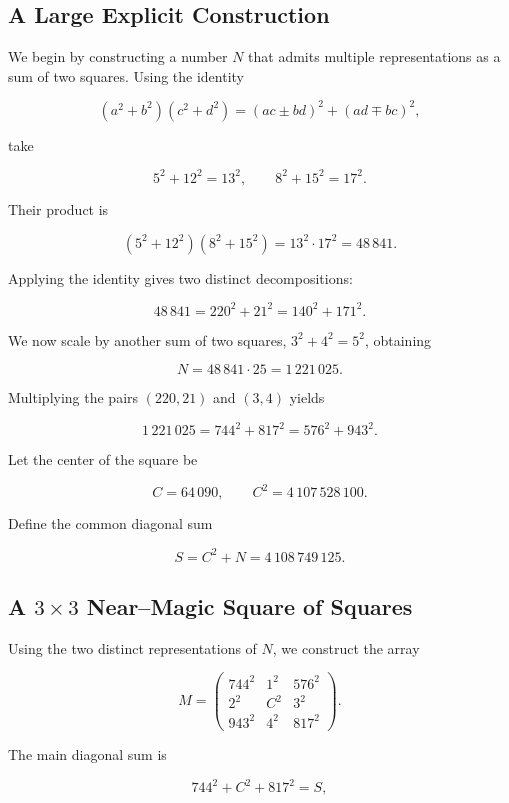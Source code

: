 \documentclass[12pt]{article}
\begin{document}
\subsection*{A Large Explicit Construction}

We begin by constructing a number $N$ that admits multiple representations as a sum of two squares.  
Using the identity


\[
(a^2+b^2)(c^2+d^2) = (ac\pm bd)^2 + (ad\mp bc)^2,
\]


take


\[
5^2+12^2 = 13^2,\qquad 8^2+15^2 = 17^2.
\]


Their product is


\[
(5^2+12^2)(8^2+15^2) = 13^2\cdot 17^2 = 48\,841.
\]


Applying the identity gives two distinct decompositions:


\[
48\,841 = 220^2 + 21^2 = 140^2 + 171^2.
\]



We now scale by another sum of two squares, $3^2+4^2=5^2$, obtaining


\[
N = 48\,841 \cdot 25 = 1\,221\,025.
\]


Multiplying the pairs $(220,21)$ and $(3,4)$ yields


\[
1\,221\,025 = 744^2 + 817^2 = 576^2 + 943^2.
\]



Let the center of the square be


\[
C = 64\,090,\qquad C^2 = 4\,107\,528\,100.
\]


Define the common diagonal sum


\[
S = C^2 + N = 4\,108\,749\,125.
\]



\subsection*{A $3\times3$ Near--Magic Square of Squares}

Using the two distinct representations of $N$, we construct the array


\[
M =
\begin{pmatrix}
744^2 & 1^2 & 576^2\\
2^2   & C^2 & 3^2\\
943^2 & 4^2 & 817^2
\end{pmatrix}.
\]


The main diagonal sum is


\[
744^2 + C^2 + 817^2 = S,
\]
\end{document}
